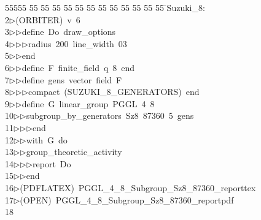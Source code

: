 %
%
\begin{tabbing}
55555 \= 55 \= 55 \= 55 \= 55 \= 55 \= 55 \= 55 \= 55 \= 55 \= 55 \= 55 \= 55 \= \>Suzuki\_8:\\[0pt]
2\>$\triangleright$\>(ORBITER)\ v\ 6\ \\[0pt]
3\>$\triangleright$\>$\triangleright$\>define\ Do\ draw\_options\ \\[0pt]
4\>$\triangleright$\>$\triangleright$\>$\triangleright$\>radius\ 200\ line\_width\ 03\ \\[0pt]
5\>$\triangleright$\>$\triangleright$\>end\ \\[0pt]
6\>$\triangleright$\>$\triangleright$\>define\ F\ finite\_field\ q\ 8\ end\ \\[0pt]
7\>$\triangleright$\>$\triangleright$\>define\ gens\ vector\ field\ F\ \\[0pt]
8\>$\triangleright$\>$\triangleright$\>$\triangleright$\>compact\ (SUZUKI\_8\_GENERATORS)\ end\ \\[0pt]
9\>$\triangleright$\>$\triangleright$\>define\ G\ linear\_group\ PGGL\ 4\ 8\ \\[0pt]
10\>$\triangleright$\>$\triangleright$\>subgroup\_by\_generators\ Sz8\ 87360\ 5\ gens\ \\[0pt]
11\>$\triangleright$\>$\triangleright$\>$\triangleright$\>end\ \\[0pt]
12\>$\triangleright$\>$\triangleright$\>with\ G\ do\ \\[0pt]
13\>$\triangleright$\>$\triangleright$\>group\_theoretic\_activity\ \\[0pt]
14\>$\triangleright$\>$\triangleright$\>$\triangleright$\>report\ Do\ \\[0pt]
15\>$\triangleright$\>$\triangleright$\>end\\[0pt]
16\>$\triangleright$\>(PDFLATEX)\ PGGL\_4\_8\_Subgroup\_Sz8\_87360\_reporttex\\[0pt]
17\>$\triangleright$\>(OPEN)\ PGGL\_4\_8\_Subgroup\_Sz8\_87360\_reportpdf\\[0pt]
18\>\end{tabbing}
